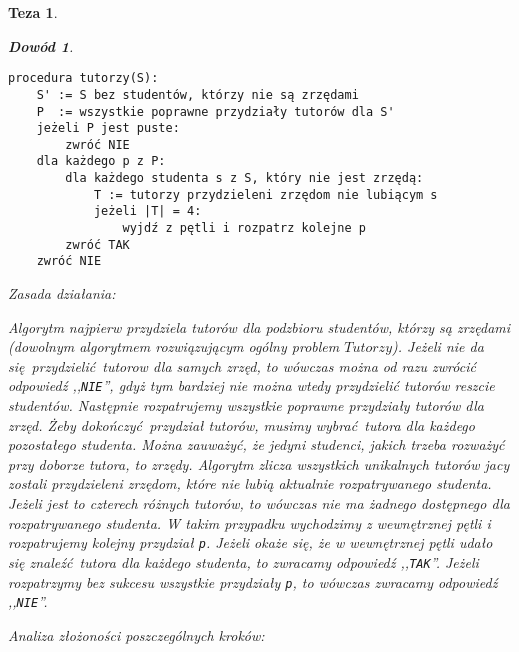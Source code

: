 \documentclass[12pt]{article}
\newtheorem*{theorem*}{Teza}
\newtheorem*{proof*}{Dowód}
\begin{document}
\begin{titlepage}
\begin{theorem*}
\begin{proof*}
\begin{verbatim}
procedura tutorzy(S):
    S' := S bez studentów, którzy nie są zrzędami
    P  := wszystkie poprawne przydziały tutorów dla S'
    jeżeli P jest puste:
        zwróć NIE
    dla każdego p z P:
        dla każdego studenta s z S, który nie jest zrzędą:
            T := tutorzy przydzieleni zrzędom nie lubiącym s
            jeżeli |T| = 4:
                wyjdź z pętli i rozpatrz kolejne p
        zwróć TAK
    zwróć NIE
\end{verbatim}

$ $\\
Zasada działania:

Algorytm najpierw przydziela tutorów dla podzbioru 
studentów, którzy są  zrzędami (dowolnym algorytmem rozwiązującym ogólny 
problem $Tutorzy$). Jeżeli nie da się przydzielić tutorow 
dla samych zrzęd, to wówczas można od razu 
zwrócić odpowiedź ,,\texttt{NIE}'', gdyż tym bardziej nie można wtedy 
przydzielić tutorów reszcie studentów. Następnie rozpatrujemy wszystkie 
poprawne przydziały tutorów dla zrzęd. Żeby dokończyć przydział tutorów, musimy 
wybrać tutora dla każdego pozostałego studenta. Można zauważyć, że jedyni 
studenci, jakich trzeba rozważyć przy doborze tutora, to zrzędy. Algorytm 
zlicza wszystkich unikalnych tutorów jacy zostali przydzieleni zrzędom, które 
nie lubią aktualnie rozpatrywanego studenta. Jeżeli jest to czterech różnych 
tutorów, to wówczas nie ma żadnego dostępnego dla rozpatrywanego studenta. W 
takim przypadku wychodzimy z wewnętrznej pętli i rozpatrujemy kolejny przydział 
\texttt{p}. Jeżeli okaże się, że w wewnętrznej pętli udało się znaleźć tutora dla każdego studenta, to zwracamy odpowiedź ,,\texttt{TAK}''. Jeżeli rozpatrzymy bez sukcesu wszystkie przydziały \texttt{p}, to wówczas zwracamy odpowiedź ,,\texttt{NIE}''.

$ $\\
$ $\\
$ $\\
Analiza złożoności poszczególnych kroków:


\end{proof*}
\end{theorem*}
\end{titlepage}
\end{document}
